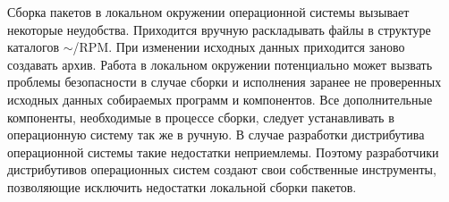 Сборка пакетов в локальном окружении операционной системы вызывает некоторые неудобства.
Приходится вручную раскладывать файлы в структуре каталогов $\sim$/RPM. При изменении
исходных данных приходится заново создавать архив. Работа в локальном окружении потенциально
может вызвать проблемы безопасности в случае сборки и исполнения заранее не проверенных исходных
данных собираемых программ и компонентов. Все дополнительные компоненты, необходимые
в процессе сборки, следует устанавливать в операционную систему так же в ручную.
В случае разработки дистрибутива операционной системы такие недостатки неприемлемы.
Поэтому разработчики дистрибутивов операционных систем создают свои собственные инструменты,
позволяющие исключить недостатки локальной сборки пакетов.
